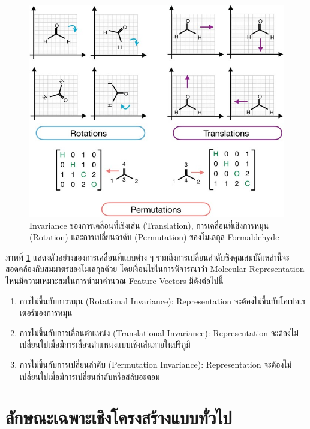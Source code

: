 \begin{figure}[H]
    \centering
    \includegraphics[width=\linewidth]{fig/mol_rep_invar.jpg}
    \caption{Invariance ของการเคลื่อนที่เชิงเส้น (Translation), การเคลื่อนที่เชิงการหมุน (Rotation) และการเปลี่ยนลำดับ (Permutation) ของโมเลกุล Formaldehyde}
    \label{fig:mol_rep_invariance}
\end{figure}

ภาพที่ \ref{fig:mol_rep_invariance} แสดงตัวอย่างของการเคลื่อนที่แบบต่าง ๆ รวมถึงการเปลี่ยนลำดับซึ่งคุณสมบัติเหล่านี้จะสอดคล้องกับสมมาตรของโมเลกุลด้วย โดยเงื่อนไขในการพิจารณาว่า Molecular Representation ไหนมีความเหมาะสมในการนำมาคำนวณ Feature Vectors มีดังต่อไปนี้

\begin{enumerate}[topsep=0pt]
    \item การไม่ขึ้นกับการหมุน (Rotational Invariance): Representation จะต้องไม่ขึ้นกับโอเปอเรเตอร์ของการหมุน

    \item การไม่ขึ้นกับการเลื่อนตำแหน่ง (Translational Invariance): Representation จะต้องไม่เปลี่ยนไปเมื่อมีการเลื่อนตำแหน่งแบบเชิงเส้นภายในปริภูมิ

    \item การไม่ขึ้นกับการเปลี่ยนลำดับ (Permutation Invariance): Representation จะต้องไม่เปลี่ยนไปเมื่อมีการเปลี่ยนลำดับหรือสลับอะตอม
\end{enumerate}

\section{ลักษณะเฉพาะเชิงโครงสร้างแบบทั่วไป}
\label{sec:struc_feat}

